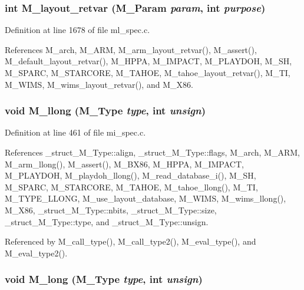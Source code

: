 \subsubsection{\setlength{\rightskip}{0pt plus 5cm}int M\_\-layout\_\-retvar (\bf{M\_\-Param} {\em param}, int {\em purpose})}\label{m__spec_8h_1e92200a730058c2abbe820f1dc73882}




Definition at line 1678 of file ml\_\-spec.c.

References M\_\-arch, M\_\-ARM, M\_\-arm\_\-layout\_\-retvar(), M\_\-assert(), M\_\-default\_\-layout\_\-retvar(), M\_\-HPPA, M\_\-IMPACT, M\_\-PLAYDOH, M\_\-SH, M\_\-SPARC, M\_\-STARCORE, M\_\-TAHOE, M\_\-tahoe\_\-layout\_\-retvar(), M\_\-TI, M\_\-WIMS, M\_\-wims\_\-layout\_\-retvar(), and M\_\-X86.
\subsubsection{\setlength{\rightskip}{0pt plus 5cm}void M\_\-llong (\bf{M\_\-Type} {\em type}, int {\em unsign})}\label{m__spec_8h_ac06107e205e4d2d7c1a1f126e72199f}




Definition at line 461 of file mi\_\-spec.c.

References \_\-struct\_\-M\_\-Type::align, \_\-struct\_\-M\_\-Type::flags, M\_\-arch, M\_\-ARM, M\_\-arm\_\-llong(), M\_\-assert(), M\_\-BX86, M\_\-HPPA, M\_\-IMPACT, M\_\-PLAYDOH, M\_\-playdoh\_\-llong(), M\_\-read\_\-database\_\-i(), M\_\-SH, M\_\-SPARC, M\_\-STARCORE, M\_\-TAHOE, M\_\-tahoe\_\-llong(), M\_\-TI, M\_\-TYPE\_\-LLONG, M\_\-use\_\-layout\_\-database, M\_\-WIMS, M\_\-wims\_\-llong(), M\_\-X86, \_\-struct\_\-M\_\-Type::nbits, \_\-struct\_\-M\_\-Type::size, \_\-struct\_\-M\_\-Type::type, and \_\-struct\_\-M\_\-Type::unsign.

Referenced by M\_\-call\_\-type(), M\_\-call\_\-type2(), M\_\-eval\_\-type(), and M\_\-eval\_\-type2().
\subsubsection{\setlength{\rightskip}{0pt plus 5cm}void M\_\-long (\bf{M\_\-Type} {\em type}, int {\em unsign})}\label{m__spec_8h_68b8f6847ce398397621c33579171fb8}




